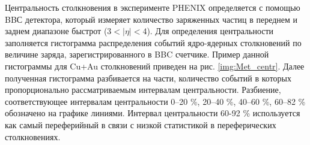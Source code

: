 Центральность столкновения в эксперименте PHENIX определяется с помощью BBС детектора, который измеряет количество заряженных частиц в переднем и заднем диапазоне быстрот ($3<|\eta|<4$). 
Для определения центральности заполняется гистограмма распределения событий ядро-ядерных столкновений по величине заряда, зарегистрированного в BBC счетчике. Пример данной гистограммы для Cu+Au столкновений приведен на рис. \ref{img:Met_centr}. Далее полученная гистограмма разбивается на части, количество событий в которых пропорционально рассматриваемым интервалам центральности. Разбиение, соответствующее интервалам центральности 0–20 \%, 20–40 \%, 40–60 \%, 60–82 \% обозначено на графике линиями. Интервал центральности 60-92 \% используется как самый переферийный в связи с низкой статистикой в переферических столкновениях.




